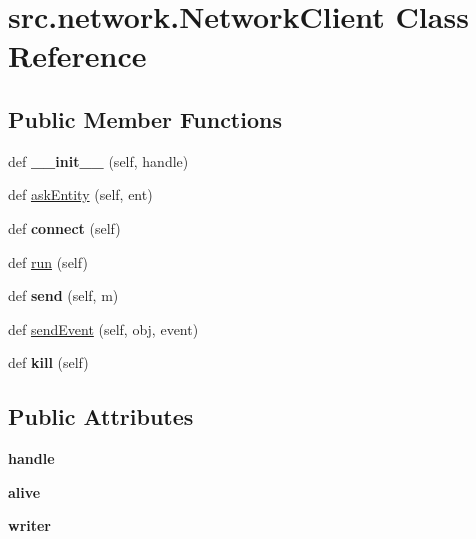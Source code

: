 \hypertarget{classsrc_1_1network_1_1_network_client}{}\section{src.\+network.\+Network\+Client Class Reference}
\label{classsrc_1_1network_1_1_network_client}
\subsection*{Public Member Functions}
\begin{DoxyCompactItemize}
\item 
\hypertarget{classsrc_1_1network_1_1_network_client_ac916d4beefd5d85ecf1c9f868778ba0a}{}\label{classsrc_1_1network_1_1_network_client_ac916d4beefd5d85ecf1c9f868778ba0a} 
def {\bfseries \+\_\+\+\_\+init\+\_\+\+\_\+} (self, handle)
\item 
def \hyperlink{classsrc_1_1network_1_1_network_client_a284788cf59342797e77659bbf1f01077}{ask\+Entity} (self, ent)
\item 
\hypertarget{classsrc_1_1network_1_1_network_client_aff658527c0a9eddaa94566b59d2bc280}{}\label{classsrc_1_1network_1_1_network_client_aff658527c0a9eddaa94566b59d2bc280} 
def {\bfseries connect} (self)
\item 
def \hyperlink{classsrc_1_1network_1_1_network_client_ab93bfbf5db5822ecb056aa4ed70b9378}{run} (self)
\item 
\hypertarget{classsrc_1_1network_1_1_network_client_aea7fd43ebd9030cfed6133ec45f07104}{}\label{classsrc_1_1network_1_1_network_client_aea7fd43ebd9030cfed6133ec45f07104} 
def {\bfseries send} (self, m)
\item 
def \hyperlink{classsrc_1_1network_1_1_network_client_a5464ebb5a065e4234703c93bf664f228}{send\+Event} (self, obj, event)
\item 
\hypertarget{classsrc_1_1network_1_1_network_client_aceb091634efd3b262be5d9879b91637a}{}\label{classsrc_1_1network_1_1_network_client_aceb091634efd3b262be5d9879b91637a} 
def {\bfseries kill} (self)
\end{DoxyCompactItemize}
\subsection*{Public Attributes}
\begin{DoxyCompactItemize}
\item 
\hypertarget{classsrc_1_1network_1_1_network_client_ae54784438c7710b1adc53f1bdeb9a2e5}{}\label{classsrc_1_1network_1_1_network_client_ae54784438c7710b1adc53f1bdeb9a2e5} 
{\bfseries handle}
\item 
\hypertarget{classsrc_1_1network_1_1_network_client_a0c5773f7b2800d9d34fb4e248602851c}{}\label{classsrc_1_1network_1_1_network_client_a0c5773f7b2800d9d34fb4e248602851c} 
{\bfseries alive}
\item 
\hypertarget{classsrc_1_1network_1_1_network_client_ade3948e9b9eeabf9d0d1555c19b26f2d}{}\label{classsrc_1_1network_1_1_network_client_ade3948e9b9eeabf9d0d1555c19b26f2d} 
{\bfseries writer}
\end{DoxyCompactItemize}


